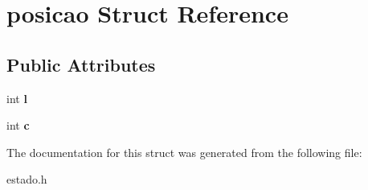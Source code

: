 \hypertarget{structposicao}{}\section{posicao Struct Reference}
\label{structposicao}
\subsection*{Public Attributes}
\begin{DoxyCompactItemize}
\item 
\mbox{\label{structposicao_a1078cef17bd7e2040f5649cca5d4896d}} 
int {\bfseries l}
\item 
\mbox{\label{structposicao_aa5eedb8d2df4c0df820e288a8ace6f1f}} 
int {\bfseries c}
\end{DoxyCompactItemize}


The documentation for this struct was generated from the following file\+:\begin{DoxyCompactItemize}
\item 
estado.\+h\end{DoxyCompactItemize}
